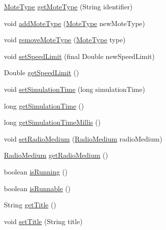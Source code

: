 \begin{DoxyCompactItemize}
\item 
\hyperlink{interfaceorg_1_1contikios_1_1cooja_1_1MoteType}{Mote\-Type} \hyperlink{classorg_1_1contikios_1_1cooja_1_1Simulation_a6a2def16017d97357c70b65d76b8a561}{get\-Mote\-Type} (String identifier)
\item 
void \hyperlink{classorg_1_1contikios_1_1cooja_1_1Simulation_aafe354c8d241a7d02320168947dc0cd4}{add\-Mote\-Type} (\hyperlink{interfaceorg_1_1contikios_1_1cooja_1_1MoteType}{Mote\-Type} new\-Mote\-Type)
\item 
void \hyperlink{classorg_1_1contikios_1_1cooja_1_1Simulation_ac8add8afcbeb281aa72b35813a9e998e}{remove\-Mote\-Type} (\hyperlink{interfaceorg_1_1contikios_1_1cooja_1_1MoteType}{Mote\-Type} type)
\item 
void \hyperlink{classorg_1_1contikios_1_1cooja_1_1Simulation_a1eebb975bc564108f149006e53865a41}{set\-Speed\-Limit} (final Double new\-Speed\-Limit)
\item 
Double \hyperlink{classorg_1_1contikios_1_1cooja_1_1Simulation_a49ca7c43f77d7842b0d7cf8bc7a9d59b}{get\-Speed\-Limit} ()
\item 
void \hyperlink{classorg_1_1contikios_1_1cooja_1_1Simulation_a38ea8498edad5fe60da724f940019e34}{set\-Simulation\-Time} (long simulation\-Time)
\item 
long \hyperlink{classorg_1_1contikios_1_1cooja_1_1Simulation_a62bd4b8997b5debaab80378847802a03}{get\-Simulation\-Time} ()
\item 
long \hyperlink{classorg_1_1contikios_1_1cooja_1_1Simulation_aed2aa6f9d4f3399db5a165ecec79d377}{get\-Simulation\-Time\-Millis} ()
\item 
void \hyperlink{classorg_1_1contikios_1_1cooja_1_1Simulation_ae3bc11e84ccd6ec80972ae3721cce982}{set\-Radio\-Medium} (\hyperlink{classorg_1_1contikios_1_1cooja_1_1RadioMedium}{Radio\-Medium} radio\-Medium)
\item 
\hyperlink{classorg_1_1contikios_1_1cooja_1_1RadioMedium}{Radio\-Medium} \hyperlink{classorg_1_1contikios_1_1cooja_1_1Simulation_a6698a9b238ebf1bf163935e49dea7ba2}{get\-Radio\-Medium} ()
\item 
boolean \hyperlink{classorg_1_1contikios_1_1cooja_1_1Simulation_a1298fc918e33caa7b0a00b716046ea20}{is\-Running} ()
\item 
boolean \hyperlink{classorg_1_1contikios_1_1cooja_1_1Simulation_a56e2232b682eb1b22d9763e7a668b6d8}{is\-Runnable} ()
\item 
String \hyperlink{classorg_1_1contikios_1_1cooja_1_1Simulation_a42c89234ae8bd779d1b13713a1d155d1}{get\-Title} ()
\item 
void \hyperlink{classorg_1_1contikios_1_1cooja_1_1Simulation_a48185c6495c9c77c02a5db194ab11ebb}{set\-Title} (String title)
\end{DoxyCompactItemize}
